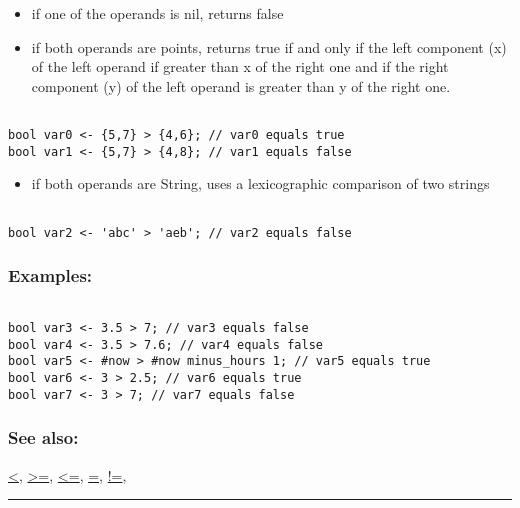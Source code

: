 \documentclass[]{book}
\providecommand{\tightlist}{%
  \setlength{\itemsep}{0pt}\setlength{\parskip}{0pt}}
\theoremstyle{definition}
\theoremstyle{definition}
\theoremstyle{definition}
\theoremstyle{remark}
\begin{document}
\begin{itemize}
\tightlist
\item
  if one of the operands is nil, returns false\\
\item
  if both operands are points, returns true if and only if the left
  component (x) of the left operand if greater than x of the right one
  and if the right component (y) of the left operand is greater than y
  of the right one.
\end{itemize}

\begin{verbatim}
 
bool var0 <- {5,7} > {4,6}; // var0 equals true 
bool var1 <- {5,7} > {4,8}; // var1 equals false
\end{verbatim}

\begin{itemize}
\tightlist
\item
  if both operands are String, uses a lexicographic comparison of two
  strings
\end{itemize}

\begin{verbatim}
 
bool var2 <- 'abc' > 'aeb'; // var2 equals false
\end{verbatim}

\subsubsection{Examples:}\label{examples-10}

\begin{verbatim}
 
bool var3 <- 3.5 > 7; // var3 equals false 
bool var4 <- 3.5 > 7.6; // var4 equals false 
bool var5 <- #now > #now minus_hours 1; // var5 equals true 
bool var6 <- 3 > 2.5; // var6 equals true 
bool var7 <- 3 > 7; // var7 equals false
\end{verbatim}

\subsubsection{See also:}\label{see-also-12}

\href{OperatorsAA\#\%3C}{\textless{}},
\href{OperatorsAA\#\%3E=}{\textgreater{}=},
\href{OperatorsAA\#\%3C=}{\textless{}=}, \href{OperatorsAA\#=}{=},
\href{OperatorsAA\#!=}{!=},

\begin{center}\rule{0.5\linewidth}{\linethickness}\end{center}
\end{document}
